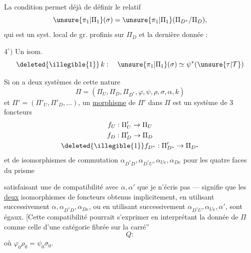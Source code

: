 
La condition  permet déjà de définir le
 relatif
\[
\unsure{\pi_1|\Pi_1}(\sigma)
 = \unsure{\pi_1|\Pi_1}(\Pi_{D^*}/\Pi_D),
\]
qui est un syst. local de gr. profinis sur $\Pi_D$
et la dernière donnée :

$4^\circ)$ Un isom. 
\[
\deleted{\illegible{1}}\,k:\quad
\unsure{\pi_1|\Pi_1}(\sigma)\simeq
\psi^*(\unsure{\tau|\mathcal T})
\]

Si on a deux systèmes de cette nature
\[
\Pi=(\Pi_U,\Pi_D,\Pi_{D^*},\varphi,\psi,\rho,\sigma,\alpha,k)
\]
et $\Pi'=(\Pi'_U,\Pi'_D,\ldots)$, un \uline{morphisme}
de $\Pi'$ dans $\Pi$ est un système de $3$ foncteurs
\[
\begin{gathered}
f_U:\Pi'_U\to\Pi_U\\
f_D:\Pi'_D\to\Pi_D\\
\deleted{\illegible{1}}f_{D^*}:\Pi'_{D^*}\to\Pi_{D^*}
\end{gathered}
\]
et de 
isomorphismes de commutation
$\alpha_{D^*D},\alpha_{D^*U},\alpha_{Ue},\alpha_{De}$
pour les quatre faces du prisme


satisfaisant une  de compatibilité avec $\alpha,\alpha'$ que je n'écris pas
---  signifie que les \uline{deux}
 isomorphismes de foncteurs
obtenus implicitement, en utilisant successivement
$\alpha,\alpha_{D^*D},\alpha_{De}$,  ou en
utilisant successivement $\alpha_{D^*U},\alpha_{Ue},\alpha'$, sont égaux.
[Cette compatibilité pourrait s'exprimer en interprétant la donnée
de $\Pi$ \inserted{\unsure{$\Pi$}} comme celle d'une catégorie
fibrée sur la 
 carré''
\[
Q:
\]
où $\varphi_0\rho_0=\psi_0\sigma_0$.

